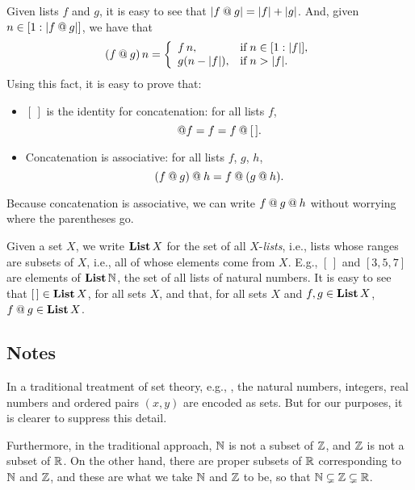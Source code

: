 Given lists $f$ and $g$, it is easy to see that $|f\mathbin{@} g| =
|f| + |g|$.  And, given $n\in[1:|f\mathbin{@} g|]$,
we have that
\begin{displaymath}
(f\myconcat g)\,n =
\casesdef{f\,n,}{\eqtxtr{if}n\in[1:|f|],}%
         {g(n-|f|),}{\eqtxtr{if}n>|f| .}
\end{displaymath}
Using this fact, it is easy to prove that:
\begin{itemize}
\item $[\,]$ is the identity for concatenation: for all lists $f$,
%
%
%
  \begin{displaymath}
    [\,]\myconcat f = f = f\myconcat [\,] .
  \end{displaymath}

\item Concatenation is associative: for all lists $f$, $g$, $h$,
%
%
%
  \begin{displaymath}
    (f\mathbin{@} g)\mathbin{@} h = f\mathbin{@}(g\mathbin{@} h) .
  \end{displaymath}
\end{itemize}
Because concatenation is associative, we can write
$f\mathbin{@} g\mathbin{@} h$ without worrying where the parentheses go.

Given a set $X$, we write $\mathbf{List}\,X$ for the set of all
$X$-\emph{lists}, i.e., lists whose
%
%
%
%
ranges are subsets of $X$, i.e., all of whose elements come
from $X$.  E.g., $[\,]$ and $[3,5,7]$ are elements of $\mathbf{List}\,\mathbb{N}$,
the set of all lists of natural numbers.  It is easy to see that
$[\,]\in\mathbf{List}\,X$, for all sets $X$, and that, for all sets $X$ and
$f,g\in\mathbf{List}\,X$, $f\mathbin{@} g\in\mathbf{List}\,X$.
%
%

\subsection{Notes}

In a traditional treatment of set theory, e.g., \cite{Enderton77}, the
natural numbers, integers, real numbers and ordered pairs
$(x,y)$ are encoded as sets.  But for our purposes, it is clearer to
suppress this detail.

Furthermore, in the traditional approach, $\mathbb{N}$ is not a subset of
$\mathbb{Z}$, and $\mathbb{Z}$ is not a subset of $\mathbb{R}$.  On the other hand,
there are proper subsets of $\mathbb{R}$ corresponding to $\mathbb{N}$ and
$\mathbb{Z}$, and these are what we take $\mathbb{N}$ and $\mathbb{Z}$ to be, so that
$\mathbb{N}\subsetneq\mathbb{Z}\subsetneq\mathbb{R}$.  %

